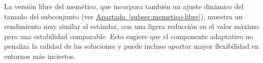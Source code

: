 La versión libre del memético, que incorpora también un ajuste dinámico del tamaño del subconjunto
(ver \hyperref[subsec:memetico-libre]{Apartado~\ref*{subsec:memetico-libre}}), muestra un rendimiento muy similar al estándar,
con una ligera reducción en el valor máximo pero una estabilidad comparable.
Esto sugiere que el componente adaptativo no penaliza la calidad de las soluciones y puede incluso aportar mayor flexibilidad en entornos más inciertos.


\begin{table}[htp]
  \centering
\end{table}
